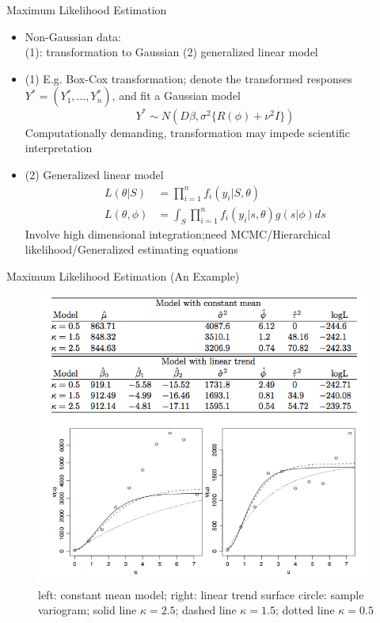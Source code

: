 \documentclass{beamer}
\begin{document}
\begin{frame}{Maximum Likelihood Estimation}
	\begin{itemize}
		\item Non-Gaussian data: \\ 
		(1): transformation to Gaussian (2)  generalized linear model 
		\item   (1) E.g. Box-Cox transformation; denote the transformed responses $Y^{\ast} = (Y_1^{\ast}, ..., Y_n^{\ast})$, and fit a Gaussian model 
		$$Y^{\ast} \sim N(D\beta, \sigma^2 \{R(\phi) + \nu^2 I\}) $$
		Computationally demanding, transformation may impede scientific interpretation
		\item (2) Generalized linear model 
		\begin{align*}  %
		L(\theta|S) &= \prod_{i=1}^n f_i(y_i|S, \theta)\\
		L(\theta, \phi) &= \int_ S \prod_{i=1}^n f_i(y_i|s, \theta)g(s|\phi) ds
		\end{align*}
		Involve high dimensional integration;need MCMC/Hierarchical likelihood/Generalized estimating equations
	\end{itemize}
\end{frame}


\begin{frame}{Maximum Likelihood Estimation (An Example)} %
	\begin{figure}
		\centering
		\includegraphics[scale = 0.35]{Images/Pic1}
		\caption{ { \scriptsize left: constant mean model; right: linear trend surface \newline  circle: sample  variogram; solid line $\kappa = 2.5$; dashed line $\kappa = 1.5$; dotted line $\kappa = 0.5$}}
	\end{figure}
\end{frame}
\end{document}
